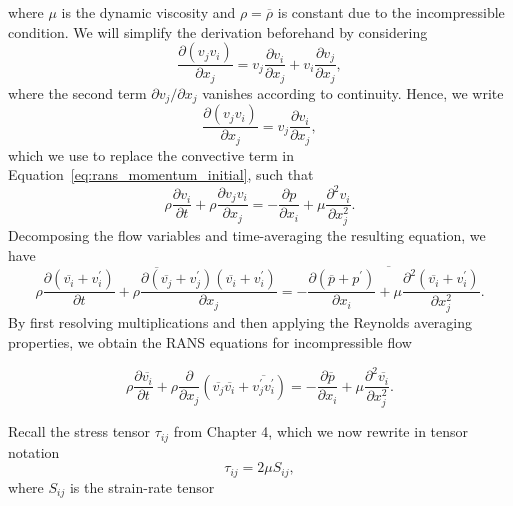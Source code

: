 where $\mu$ is the dynamic viscosity and $\rho=\overline{\rho}$ is constant due to the incompressible condition. We will simplify the derivation beforehand by considering
\begin{equation}
    \frac{\partial \left(v_jv_i\right)}{\partial x_j} = v_j \frac{\partial v_i}{\partial x_j} + v_i \frac{\partial v_j}{\partial x_j},
\end{equation}
where the second term $\partial v_j/\partial x_j$ vanishes according to continuity. Hence, we write
\begin{equation}
    \frac{\partial \left(v_jv_i\right)}{\partial x_j} = v_j \frac{\partial v_i}{\partial x_j},
\end{equation}
which we use to replace the convective term in Equation~\ref{eq:rans_momentum_initial}, such that
\begin{equation}
    \rho\frac{\partial  v_i}{\partial t} + \rho\frac{\partial  v_j v_i}{\partial x_j} =
    - \frac{\partial p}{\partial x_i} + \mu \frac{\partial^2 v_i}{\partial x_j^2}.
\end{equation}
Decomposing the flow variables and time-averaging the resulting equation, we have
\begin{equation}
    \overline{ 
    \rho\frac{\partial  \left(\overline{v_i}+v_i^\prime\right)}{\partial t} 
    + \rho \frac{\partial  \left(\overline{v_j} + v_j^\prime\right)\left(\overline{v_i}+ v_i^\prime\right)}{\partial x_j}} = \overline{
     - \frac{\partial \left(\overline{p}+p^\prime\right)}{\partial x_i} 
    + \mu \frac{\partial^2 \left(\overline{v_i}
    +v_i^\prime\right)}{\partial x_j^2}}.
\end{equation}
By first resolving multiplications and then applying the Reynolds averaging properties, we obtain the RANS equations for incompressible flow
\begin{eqBox}
\begin{equation}
    \rho \frac{\partial \overline{v_i}}{\partial t} 
    + \rho  \frac{\partial}{\partial x_j} \left(\overline{v_j}\overline{v_i} + \overline{v_j^\prime v_i^\prime}\right)
    =- \frac{\partial \overline{p}}{\partial x_i} 
    + \mu \frac{\partial^2 \overline{v_i}}{\partial x_j^2}.
\end{equation}
\end{eqBox}
Recall the stress tensor $\tau_{ij}$ from Chapter 4, which we now rewrite in tensor notation
\begin{equation}
    \tau_{ij} = 2\mu S_{ij},
\end{equation}
where $S_{ij}$ is the strain-rate tensor
